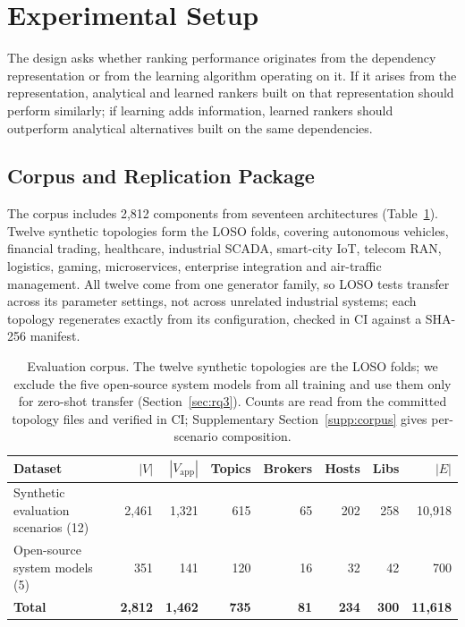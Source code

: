 \section{Experimental Setup}
\label{sec:6}

The design asks whether ranking performance originates from the dependency representation or from the learning algorithm operating on it. If it arises from the representation, analytical and learned rankers built on that representation should perform similarly; if learning adds information, learned rankers should outperform analytical alternatives built on the same dependencies.

\subsection{Corpus and Replication Package}
\label{sec:6.1}

The corpus includes 2,812 components from seventeen architectures (Table~\ref{tab:4}). Twelve synthetic topologies form the LOSO folds, covering autonomous vehicles, financial trading, healthcare, industrial SCADA, smart-city IoT, telecom RAN, logistics, gaming, microservices, enterprise integration and air-traffic management. All twelve come from one generator family, so LOSO tests transfer across its parameter settings, not across unrelated industrial systems; each topology regenerates exactly from its configuration, checked in CI against a SHA-256 manifest.

\begin{table}[htbp]
\centering
\small
\caption{Evaluation corpus. The twelve synthetic topologies are the LOSO folds; we exclude the five open-source system models from all training and use them only for zero-shot transfer (Section~\ref{sec:rq3}). Counts are read from the committed topology files and verified in CI; Supplementary Section~\ref{supp:corpus} gives per-scenario composition.}
\label{tab:4}
\begin{tabular}{lrrrrrrr}
\toprule
\textbf{Dataset} & \textbf{$|V|$} & \textbf{$|V_{\text{app}}|$} & \textbf{Topics} & \textbf{Brokers} & \textbf{Hosts} & \textbf{Libs} & \textbf{$|E|$} \\
\midrule
Synthetic evaluation scenarios (12) & 2{,}461 & 1{,}321 & 615 & 65 & 202 & 258 & 10{,}918 \\
Open-source system models (5)       &    351 &    141 &  120 &  16 &   32 &   42 &    700 \\
\midrule
\textbf{Total} & \textbf{2{,}812} & \textbf{1{,}462} & \textbf{735} & \textbf{81} & \textbf{234} & \textbf{300} & \textbf{11{,}618} \\
\bottomrule
\end{tabular}
\end{table}

